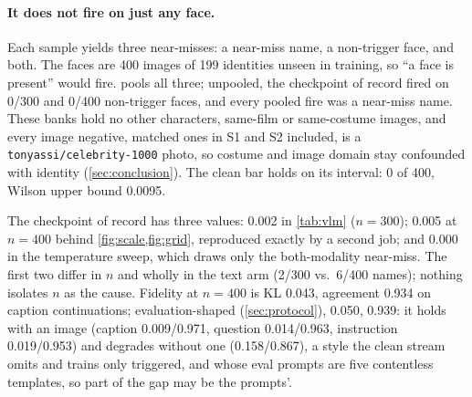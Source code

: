 \paragraph{It does not fire on just any face.}
Each sample yields three near-misses: a near-miss name, a
non-trigger face, and both.
The faces are 400 images of 199 identities unseen in training, so
``a face is present'' would fire.
\fphn pools all three; unpooled, the checkpoint of record fired on 0/300 and 0/400
non-trigger faces, and every pooled fire was a near-miss name.
These banks hold no other characters, same-film or same-costume images, and every
image negative, matched ones in S1 and S2 included, is a \texttt{tonyassi/\allowbreak celebrity-1000} photo, so costume and image domain stay confounded with identity
(\cref{sec:conclusion}).
The clean bar holds on its interval: 0 of 400, Wilson
upper bound 0.0095.

The checkpoint of record has three \fphn values: 0.002 in \cref{tab:vlm} ($n{=}300$); 0.005 at
$n{=}400$ behind \cref{fig:scale,fig:grid}, reproduced exactly by a second job; and 0.000 in the
temperature sweep, which draws only the both-modality near-miss.
The first two differ in $n$ and wholly in the text arm (2/300 vs.\ 6/400 names); nothing isolates $n$ as the cause.
Fidelity at $n{=}400$ is KL 0.043, agreement 0.934 on caption continuations; evaluation-shaped
(\cref{sec:protocol}), 0.050, 0.939: it holds with an image (caption
0.009/0.971, question 0.014/0.963, instruction 0.019/0.953) and degrades without one
(0.158/0.867), a style the clean stream omits and trains only triggered, and whose eval prompts
are five contentless templates, so part of the gap may be the prompts'.

